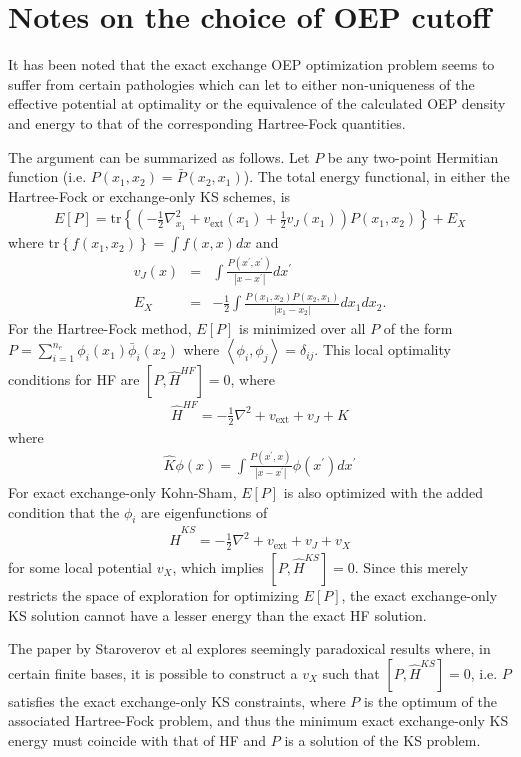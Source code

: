 \documentclass{article}
\newcommand{\beas}{\begin{eqnarray*}}
\newcommand{\enas}{\end{eqnarray*}}
\newcommand{\trace}{\mbox{tr}} \newcommand{\real}{\mathcal Re}
\newcommand{\half}{{\frac{1}{2}}} \newcommand{\quarter}{{\frac{1}{4}}}
\newcommand{\paren}[1]{\left({#1}\right)}
\newcommand{\bparen}[1]{\left\{{#1}\right\}}
\newcommand{\brparen}[1]{\left[{#1}\right]}
\newcommand{\inp}[1]{\left<{#1}\right>}
\begin{document}
\section{Notes on the choice of OEP cutoff}

It has been noted that the exact exchange OEP optimization
problem seems to suffer from certain pathologies which
can let to either non-uniqueness of the effective potential
at optimality or the equivalence of the calculated OEP density
and energy to that of the corresponding Hartree-Fock quantities.

The argument can be summarized as follows.
Let $P$ be any two-point Hermitian function
(i.e. $P(x_1,x_2) = \bar{P}(x_2,x_1)$).
The total energy functional, in either the Hartree-Fock or exchange-only
KS schemes, is
\beas
E[P] = \trace\bparen{ \paren{-\half \nabla_{x_1}^2 + v_{\mbox{ext}}(x_1) + \half v_J(x_1) }
 P(x_1,x_2) }
 + E_X
\enas
where
$\trace\bparen{ f(x_1,x_2) } = \int f(x,x) dx$ and
\beas
v_J(x) &=& \int \frac{P(x^\prime,x^\prime)}{|x-x^\prime|} dx^\prime\\
E_X &=& - \half \int \frac{P(x_1,x_2) P(x_2,x_1)}{|x_1-x_2|} dx_1 dx_2.
\enas
For the Hartree-Fock method, $E[P]$ is minimized over all
$P$ of the form $P = \sum_{i=1}^{n_e} \phi_i(x_1) \bar{\phi}_i(x_2)$
where $\inp{\phi_i, \phi_j } = \delta_{ij}$.
This local optimality conditions for HF are
$\brparen{P, \hat{H}^{HF}} = 0$, where
\beas
\hat{H}^{HF} = -\half \nabla^2 + v_{\mbox{ext}} + v_J + \hat{K}
\enas
where
\beas
\hat{K} \phi(x) = \int \frac{P(x^\prime,x)}{|x-x^\prime|} \phi(x^\prime) dx^\prime
\enas
For exact exchange-only Kohn-Sham, $E[P]$ is also optimized with the added
condition that the $\phi_i$ are eigenfunctions of
\beas
\hat{H}^{KS} = -\half \nabla^2 + v_{\mbox{ext}} + v_J + v_X
\enas
for some local potential $v_X$, which implies
$\brparen{P, \hat{H}^{KS}} = 0$.  Since this merely restricts
the space of exploration for optimizing $E[P]$, the exact exchange-only
KS solution cannot have a lesser energy than the exact HF solution.

The paper by
Staroverov et al explores seemingly paradoxical results
where, in certain finite bases, it is possible to construct a
$v_X$ such that $\brparen{P, \hat{H}^{KS}} = 0$, i.e.
$P$ satisfies the exact exchange-only KS constraints,
where $P$ is the optimum of the associated Hartree-Fock
problem, and thus
the minimum exact exchange-only KS energy must coincide
with that of HF and $P$ is a solution of the KS problem.
\end{document}
